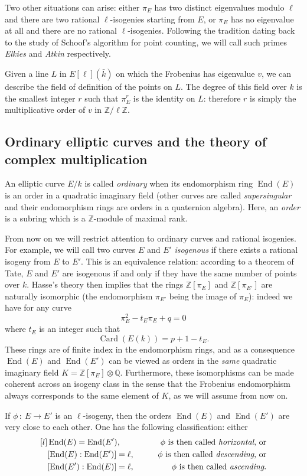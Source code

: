 \documentclass{article}
\newcommand{\Q}{\mathbb{Q}}
\newcommand{\Z}{\mathbb{Z}}
\newcommand{\from}{\ensuremath{\,:\ }}
\theoremstyle{definition}
\DeclareMathOperator{\End}{End}
\DeclareMathOperator{\Card}{Card}
\begin{document}
Two other situations can arise: either $\pi_E$ has two distinct eigenvalues 
modulo $\ell$ and there are two rational $\ell$-isogenies starting from $E$, or 
$\pi_E$ has no eigenvalue at all and there are no rational $\ell$-isogenies. 
Following the tradition dating back to the study of Schoof's algorithm for 
point counting, we will call such primes \emph{Elkies} and \emph{Atkin} 
respectively.

Given a line $L$ in $E[\ell](\bar{k})$ on which the Frobenius has eigenvalue $v$,
we can describe the field of definition of the points on $L$. The degree of this
field over $k$ is the smallest integer $r$ such that $\pi_E^r$ is the identity
on $L$: therefore $r$ is simply the multiplicative order of $v$ in $\Z/\ell\Z$.



\subsection{Ordinary elliptic curves and the theory of complex multiplication}

An elliptic curve $E/k$ is called \emph{ordinary} when its endomorphism ring $
\End(E)$ is an order in a quadratic imaginary field (other curves are called 
\emph{supersingular} and their endomorphism rings are orders in a quaternion 
algebra). Here, an \emph{order} is a subring which is a $\Z$-module of maximal 
rank. 

From now on we will restrict attention to ordinary curves and rational 
isogenies. For example, we will call two curves $E$ and $E'$ \emph{isogenous} 
if there exists a rational isogeny from $E$ to $E'$. This is an equivalence 
relation: according to a theorem of Tate, $E$ and $E'$ are isogenous if and 
only if they have the same number of points over $k$. Hasse's theory then 
implies that the rings $\Z[\pi_E]$ and $\Z[\pi_{E'}]$ are naturally isomorphic 
(the endomorphism
$\pi_{E'}$ being the image of $\pi_{E}$): indeed we have for any curve
\[
\pi_E^2 - t_E\pi_E + q = 0
\]
where $t_E$ is an integer such that
\[
\Card(E(k)) = p + 1 - t_E.
\]
These rings are of finite index in the endomorphism rings, and as a consequence 
$\End(E)$ and $\End(E')$ can be viewed as orders in the \emph{same} quadratic 
imaginary field $K = \Z[\pi_E]\otimes\Q$. Furthermore, these isomorphisms can 
be made coherent across an isogeny class in the sense that the Frobenius 
endomorphism always corresponds to the same element of $K$, as we will assume
from now on.

If $\phi\from E\to E'$ is an $\ell$-isogeny, then the orders $\End(E)$ and $\End
(E')$ are very close to each other. One has the following classification: either
\[
\begin{aligned}[l]
&\End(E) = \End(E'),
&\qquad\text{$\phi$ is then called \emph{horizontal}, or} &\\
&[\End(E):\End(E')] = \ell,
&\qquad\text{$\phi$ is then called \emph{descending}, or} &\\
&[\End(E'):\End(E)] = \ell,
&\qquad\text{$\phi$ is then called \emph{ascending}.} &
\end{aligned}
\]
\end{document}
